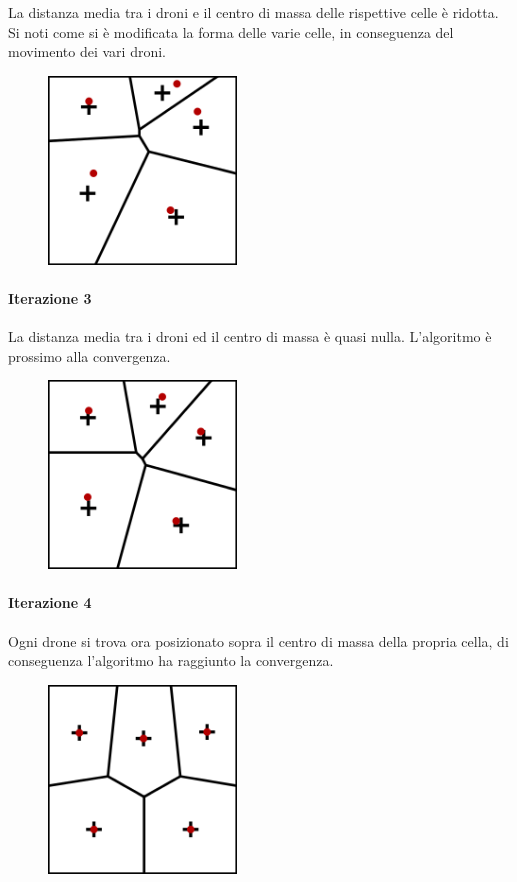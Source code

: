 \documentclass[11pt,a4paper]{report}
\begin{document}
La distanza media tra i droni e il centro di massa delle rispettive celle è ridotta. Si noti come si è modificata la forma delle varie celle, in conseguenza del movimento dei vari droni.

\begin{figure}[H]
\includegraphics[width=5cm]{lloyd_iterazione_2.png}
\centering
\end{figure}

\paragraph{Iterazione 3}

La distanza media tra i droni ed il centro di massa è quasi nulla. L'algoritmo è prossimo alla convergenza.

\begin{figure}[H]
\includegraphics[width=5cm]{lloyd_iterazione_3.png}
\centering
\end{figure}

\paragraph{Iterazione 4}

Ogni drone si trova ora posizionato sopra il centro di massa della propria cella, di conseguenza l'algoritmo ha raggiunto la convergenza.

\begin{figure}[H]
\includegraphics[width=5cm]{lloyd_iterazione_4.png}
\centering
\end{figure}
\end{document}
